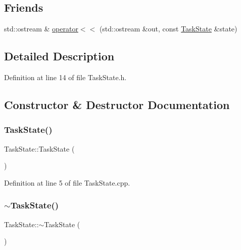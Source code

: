 \subsection*{Friends}
\begin{DoxyCompactItemize}
\item 
std\+::ostream \& \hyperlink{classocra_1_1TaskState_a198f19e781235b9c28f8607c5b63f4a8}{operator$<$$<$} (std\+::ostream \&out, const \hyperlink{classocra_1_1TaskState}{Task\+State} \&state)
\end{DoxyCompactItemize}


\subsection{Detailed Description}


Definition at line 14 of file Task\+State.\+h.



\subsection{Constructor \& Destructor Documentation}
\hypertarget{classocra_1_1TaskState_ac1f837e41fe77702983ca2931eb7335f}{}\label{classocra_1_1TaskState_ac1f837e41fe77702983ca2931eb7335f} 
\subsubsection{\texorpdfstring{Task\+State()}{TaskState()}}
{\footnotesize\ttfamily Task\+State\+::\+Task\+State (\begin{DoxyParamCaption}{ }\end{DoxyParamCaption})}



Definition at line 5 of file Task\+State.\+cpp.

\hypertarget{classocra_1_1TaskState_af41cac3e2be634b88815fde36a75434f}{}\label{classocra_1_1TaskState_af41cac3e2be634b88815fde36a75434f} 
\subsubsection{\texorpdfstring{$\sim$\+Task\+State()}{~TaskState()}}
{\footnotesize\ttfamily Task\+State\+::$\sim$\+Task\+State (\begin{DoxyParamCaption}{ }\end{DoxyParamCaption})\hspace{0.3cm}{\ttfamily [virtual]}}



